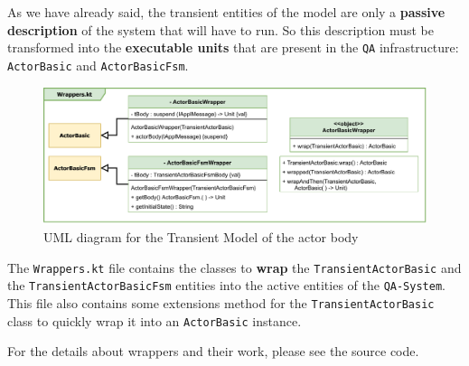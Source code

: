 As we have already said, the transient entities of the model are only a \textbf{passive description} of the system that will have to run. So this description must be transformed into the \textbf{executable units} that are present in the \texttt{QA} infrastructure: \texttt{ActorBasic} and \texttt{ActorBasicFsm}.

\begin{figure}[h]
	\centering
	\includegraphics[width=\textwidth]{img/[UML]it.unibo.kaktor.builders_wrapper}
	\caption{UML diagram for the Transient Model of the actor body}
	\label{fig::builders_wrapper}
\end{figure}

The \texttt{Wrappers.kt} file contains the classes to \textbf{wrap} the \texttt{TransientActorBasic} and the \texttt{TransientActorBasicFsm} entities into the active entities of the \texttt{QA-System}.
This file also contains some extensions method for the \texttt{TransientActorBasic} class to quickly wrap it into an \texttt{ActorBasic} instance.

For the details about wrappers and their work, please see the source code.